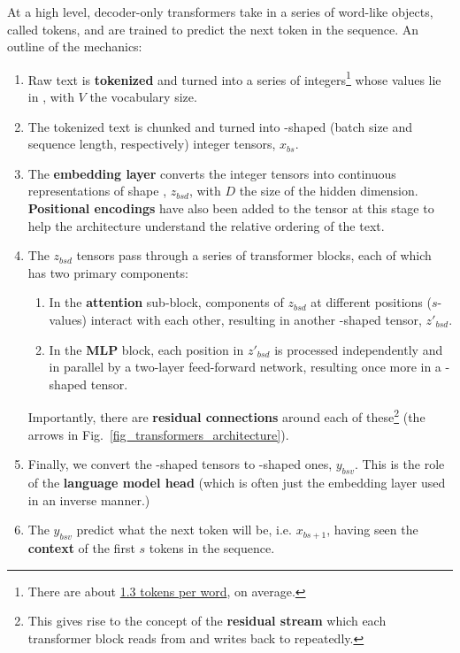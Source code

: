 \documentclass[11pt]{article}
\begin{document}
At a high level, decoder-only transformers take in a series of word-like objects, called tokens, and are trained
to predict the next token in the sequence. An outline of the mechanics:
\begin{enumerate}
    \item Raw text is \textbf{tokenized} and turned into a series of integers\footnote{There are
        about \href{https://github.com/ray-project/llm-numbers}{1.3 tokens per word}, on average.} whose values lie in , with $ V $ the vocabulary
        size.
    \item The tokenized text is chunked and turned into -shaped (batch size and
        sequence length, respectively) integer tensors, $ x _{ bs } $.
    \item The \textbf{embedding layer} converts the integer tensors into continuous representations of shape
        , $ z _{ bsd } $, with $ D $ the size of the hidden dimension.
        \textbf{Positional encodings} have also been added to the tensor at this stage to help the
        architecture understand the relative ordering of the text.
    \item The $ z _{ bsd } $ tensors pass through a series of transformer blocks, each of which has
        two primary components:
        \begin{enumerate}
        \item In the \textbf{attention} sub-block, components of $ z _{ bsd } $ at different
            positions ($ s $-values) interact with each other, resulting in another -shaped
            tensor, $  z' _{ bsd } $.
        \item In the \textbf{MLP} block, each position in  $ z' _{ bsd } $ is processed
            independently and in parallel by a two-layer feed-forward network, resulting once more
            in a -shaped tensor.
        \end{enumerate}
        Importantly, there are \textbf{residual connections} around each of these\footnote{This
        gives rise to the concept of the \textbf{residual stream} which each transformer block reads
        from and writes back to repeatedly.} (the arrows in Fig.~\ref{fig_transformers_architecture}).
    \item Finally, we convert the -shaped
        tensors to -shaped ones, $ y _{ bsv } $. This is the role of
        the \textbf{language model head} (which is often just the embedding layer used in an inverse
        manner.)
    \item  The $ y _{ bsv } $ predict what the next token will be, i.e. $ x _{ bs+1 } $, having seen the \textbf{context}
        of the first $ s $ tokens in the sequence.
\end{enumerate}
\end{document}
